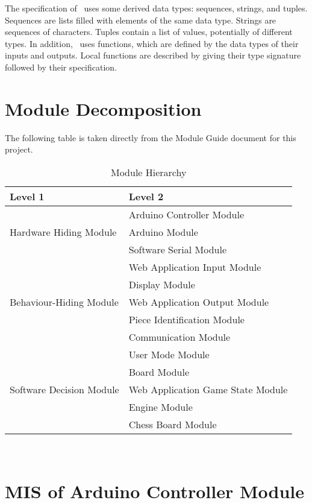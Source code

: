 \documentclass[12pt, titlepage]{article}
\begin{document}
\noindent
The specification of \progname \ uses some derived data types: sequences, strings, and
tuples. Sequences are lists filled with elements of the same data type. Strings
are sequences of characters. Tuples contain a list of values, potentially of
different types. In addition, \progname \ uses functions, which
are defined by the data types of their inputs and outputs. Local functions are
described by giving their type signature followed by their specification.

\section{Module Decomposition}

The following table is taken directly from the Module Guide document for this project.

\begin{table}[h!]
\centering
\begin{tabular}{p{} p{}}
\toprule
\textbf{Level 1} & \textbf{Level 2}\\
\midrule


\multirow{3}{0.3\textwidth}{Hardware Hiding Module}
& Arduino Controller Module \\ 
& Arduino Module \\
& Software Serial Module \\
\midrule

\multirow{5}{0.3\textwidth}{Behaviour-Hiding Module} 
& Web Application Input Module\\
& Display Module\\
& Web Application Output Module\\
& Piece Identification Module \\
& Communication Module\\
\midrule

\multirow{5}{0.3\textwidth}{Software Decision Module} 
& User Mode Module\\
& Board Module\\
& Web Application Game State Module\\
& Engine Module\\
& Chess Board Module\\
\bottomrule

\end{tabular}
\caption{Module Hierarchy}
\label{TblMH}
\end{table}

\newpage
~\newpage


\section{MIS of Arduino Controller Module} \label{ArduinoControllerModule}
\end{document}
